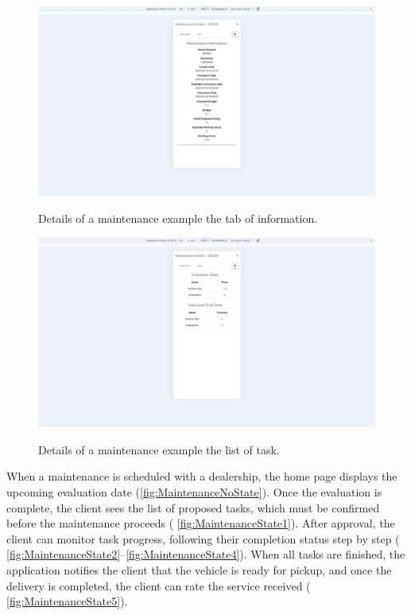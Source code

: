 \begin{figure}[h]
  \caption{Details of a maintenance example the tab of information.}
  \centering
  \includegraphics[width=\textwidth]{figs/Implementation/client/MaintenanceDetailsInfo}
  \label{fig:MaintenanceDetailsInfo}
\end{figure}


\begin{figure}[h]
  \caption{Details of a maintenance example the list of task.}
  \centering
  \includegraphics[width=\textwidth]{figs/Implementation/client/MaintenanceDetailsTasks}
  \label{fig:MaintenanceDetailsTasks}
\end{figure}


When a maintenance is scheduled with a dealership, the home page displays the upcoming evaluation date (\ref{fig:MaintenanceNoState}). Once the evaluation is complete, the client sees the list of proposed tasks, which must be confirmed before the maintenance proceeds ( \ref{fig:MaintenanceState1}). After approval, the client can monitor task progress, following their completion status step by step ( \ref{fig:MaintenanceState2}–\ref{fig:MaintenanceState4}). When all tasks are finished, the application notifies the client that the vehicle is ready for pickup, and once the delivery is completed, the client can rate the service received ( \ref{fig:MaintenanceState5}).

